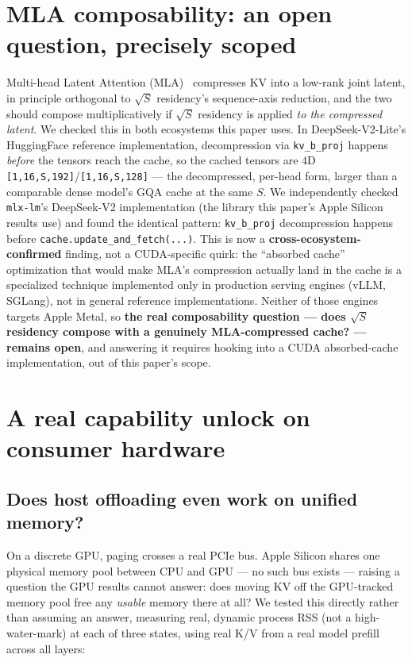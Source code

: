 \documentclass[11pt]{article}
\begin{document}
\section{MLA composability: an open question, precisely scoped}
\label{sec:mla}

Multi-head Latent Attention (MLA)~\cite{deepseekv2} compresses KV into a
low-rank joint latent, in principle orthogonal to $\sqrt{S}$ residency's
sequence-axis reduction, and the two should compose multiplicatively if
$\sqrt{S}$ residency is applied \emph{to the compressed latent}. We checked
this in both ecosystems this paper uses. In DeepSeek-V2-Lite's HuggingFace
reference implementation, decompression via \texttt{kv\_b\_proj} happens
\emph{before} the tensors reach the cache, so the cached tensors are
$4$D \texttt{[1,16,S,192]}/\texttt{[1,16,S,128]} --- the decompressed,
per-head form, larger than a comparable dense model's GQA cache at the same
$S$. We independently checked \texttt{mlx-lm}'s DeepSeek-V2 implementation
(the library this paper's Apple Silicon results use) and found the
identical pattern: \texttt{kv\_b\_proj} decompression happens before
\texttt{cache.update\_and\_fetch(...)}. This is now a
\textbf{cross-ecosystem-confirmed} finding, not a CUDA-specific quirk: the
``absorbed cache'' optimization that would make MLA's compression actually
land in the cache is a specialized technique implemented only in
production serving engines (vLLM, SGLang), not in general reference
implementations. Neither of those engines targets Apple Metal, so
\textbf{the real composability question --- does $\sqrt{S}$ residency
compose with a genuinely MLA-compressed cache? --- remains open}, and
answering it requires hooking into a CUDA absorbed-cache implementation, out
of this paper's scope.

\section{A real capability unlock on consumer hardware}
\label{sec:mac}

\subsection{Does host offloading even work on unified memory?}
On a discrete GPU, paging crosses a real PCIe bus. Apple Silicon shares one
physical memory pool between CPU and GPU --- no such bus exists --- raising
a question the GPU results cannot answer: does moving KV off the
GPU-tracked memory pool free any \emph{usable} memory there at all? We
tested this directly rather than assuming an answer, measuring real,
dynamic process RSS (not a high-water-mark) at each of three states, using
real K/V from a real model prefill across all layers:
\end{document}
